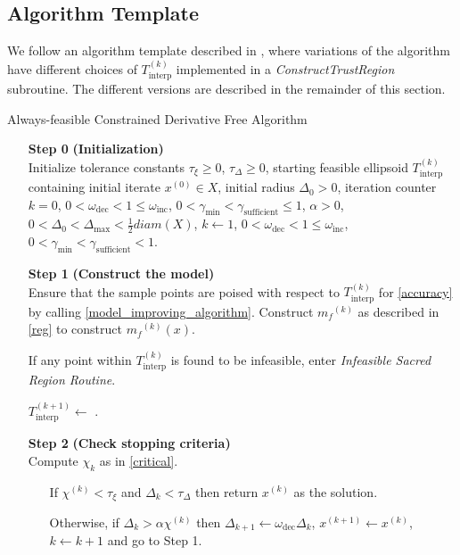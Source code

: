 \documentclass{article}
\theoremstyle{case}
\newcommand{\domain}{X}
\newcommand{\modelk}{{{m}_f}^{(k)}}
\newcommand{\iteratek}{{x}^{(k)}}
\newcommand{\sampletrk}{{T_{\text{interp}}^{(k)}}}
\newcommand{\chik}{{\chi^{(k)}}}
\newcommand{\omegainc}{\omega_{\text{inc}}}
\newcommand{\omegadec}{\omega_{\text{dec}}}
\newcommand{\gammasm}{\gamma_{\text{min}}}
\newcommand{\gammabi}{\gamma_{\text{sufficient}}}
\newcommand{\dk}{\Delta_k}
\newcommand{\infeasiblesacred}{\emph{Infeasible Sacred Region Routine}}
\begin{document}
\subsection{Algorithm Template}

We follow an algorithm template described in \cite{doi:10.1080/10556788.2015.1026968}, where variations of the algorithm have different choices of $ \sampletrk $ implemented in a \emph{ConstructTrustRegion} subroutine.
The different versions are described in the remainder of this section.



\begin{algorithm}[H]
    \caption{Always-feasible Constrained Derivative Free Algorithm}
    \label{constrained_dfo}
    \begin{itemize}
        \item[\textbf{Step 0}] \textbf{(Initialization)} \\
            Initialize tolerance constants
            $\tau_{\xi} \ge 0$,
            $\tau_{\Delta} \ge 0$,
            starting feasible ellipsoid $ \sampletrk $ containing initial iterate $x^{(0)} \in \domain$,
            initial radius $\Delta_0 > 0$,
            iteration counter $k=0$,
            $0 < \omegadec < 1 \le \omegainc$,
            $0 < \gammasm < \gammabi \le 1$,
            $\alpha > 0$,
            $0 < \Delta_0 < \Delta_{\text{max}} < \frac 1 2 diam(\domain)$,
            $k \gets 1$,
            $0 < \omegadec < 1 \le \omegainc$,
            $0 < \gammasm < \gammabi < 1$.
            
        \item[\textbf{Step 1}] \textbf{(Construct the model)} \\
            Ensure that the sample points are poised with respect to $ \sampletrk $ for \cref{accuracy} by calling \cref{model_improving_algorithm}.
            Construct $\modelk$ as described in \cref{reg} to construct $\modelk(x)$.
            
            If any point within $ \sampletrk $ is found to be infeasible, enter \infeasiblesacred.
            
            $ {T_{\text{interp}}^{(k+1)}} \gets $ .
        
        \item[\textbf{Step 2}] \textbf{(Check stopping criteria)} \\
            Compute $\chi_k$ as in \cref{critical}. \begin{itemize}
                \item[] If $ \chik < \tau_{\xi} $ and $\dk <\tau_{\Delta}$ then return $\iteratek$ as the solution.
                \item[] Otherwise, if $\dk > \alpha \chik$ then 
                $\Delta_{k+1} \gets \omegadec \Delta_{k}$, 
                $x^{(k+1)} \gets \iteratek$,
                $k \gets k+1$ and go to Step 1.
            \end{itemize}
        

\end{itemize}
\end{algorithm}
\end{document}
